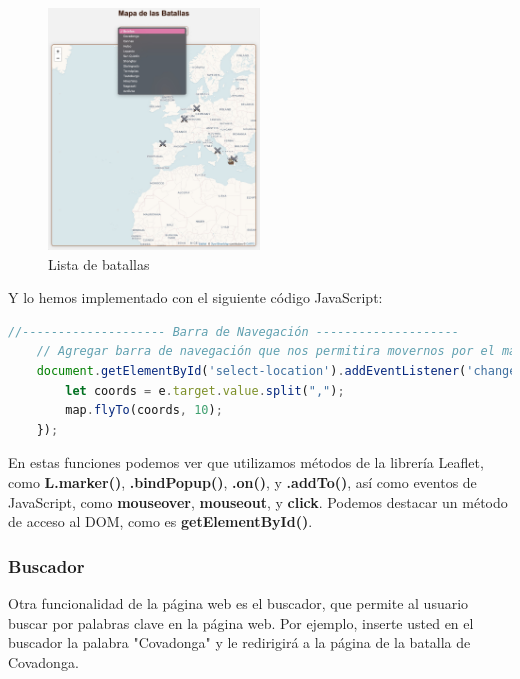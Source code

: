 \documentclass{article}
\begin{document}
\begin{figure}[H]
    \centering
    \includegraphics[width=0.5\textwidth]{jsFotos/mapaLista.jpg}
    \caption{Lista de batallas}
    \label{fig:foro_interface}
\end{figure}

Y lo hemos implementado con el siguiente código JavaScript:

\begin{lstlisting}[language=JavaScript, caption=Código para ir a la batalla desde la lista]
    //-------------------- Barra de Navegación --------------------
    // Agregar barra de navegación que nos permitira movernos por el mapa
    document.getElementById('select-location').addEventListener('change', function(e) {
        let coords = e.target.value.split(",");
        map.flyTo(coords, 10);
    });
\end{lstlisting}

\vspace{5mm}
En estas funciones podemos ver que utilizamos métodos de la librería Leaflet, como \textbf{L.marker()}, \textbf{.bindPopup()}, \textbf{.on()}, y \textbf{.addTo()}, así como eventos de JavaScript, como \textbf{mouseover}, \textbf{mouseout}, y \textbf{click}. Podemos destacar un método de acceso al DOM, como es \textbf{getElementById()}.

\newpage

\subsubsection{Buscador}

Otra funcionalidad de la página web es el buscador, que permite al usuario buscar por palabras clave en la página web. Por ejemplo, inserte usted en el buscador la palabra "Covadonga" y le redirigirá a la página de la batalla de Covadonga.
\end{document}
